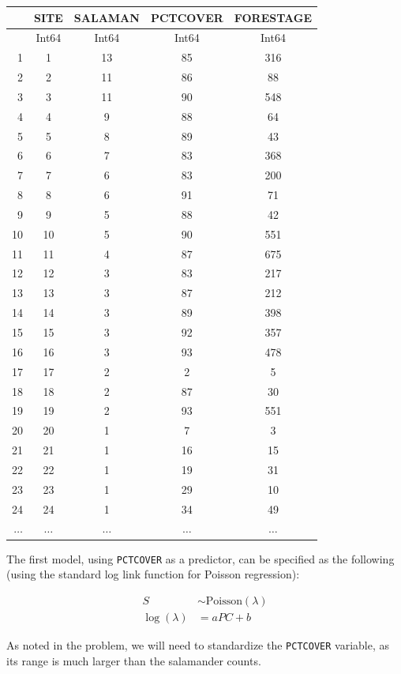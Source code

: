 \documentclass[
  letterpaper,
  DIV=11,
  numbers=noendperiod]{scrartcl}
\begin{document}
\begin{tabular}{r|cccc}
    & SITE & SALAMAN & PCTCOVER & FORESTAGE\\
    \hline
    & Int64 & Int64 & Int64 & Int64\\
    \hline
    1 & 1 & 13 & 85 & 316 \\
    2 & 2 & 11 & 86 & 88 \\
    3 & 3 & 11 & 90 & 548 \\
    4 & 4 & 9 & 88 & 64 \\
    5 & 5 & 8 & 89 & 43 \\
    6 & 6 & 7 & 83 & 368 \\
    7 & 7 & 6 & 83 & 200 \\
    8 & 8 & 6 & 91 & 71 \\
    9 & 9 & 5 & 88 & 42 \\
    10 & 10 & 5 & 90 & 551 \\
    11 & 11 & 4 & 87 & 675 \\
    12 & 12 & 3 & 83 & 217 \\
    13 & 13 & 3 & 87 & 212 \\
    14 & 14 & 3 & 89 & 398 \\
    15 & 15 & 3 & 92 & 357 \\
    16 & 16 & 3 & 93 & 478 \\
    17 & 17 & 2 & 2 & 5 \\
    18 & 18 & 2 & 87 & 30 \\
    19 & 19 & 2 & 93 & 551 \\
    20 & 20 & 1 & 7 & 3 \\
    21 & 21 & 1 & 16 & 15 \\
    22 & 22 & 1 & 19 & 31 \\
    23 & 23 & 1 & 29 & 10 \\
    24 & 24 & 1 & 34 & 49 \\
    $\dots$ & $\dots$ & $\dots$ & $\dots$ & $\dots$ \\
\end{tabular}

The first model, using \texttt{PCTCOVER} as a predictor, can be
specified as the following (using the standard log link function for
Poisson regression):

\[
\begin{aligned}
S &\sim \text{Poisson}(\lambda) \\
\log(\lambda) &= a PC + b
\end{aligned}
\]

As noted in the problem, we will need to standardize the
\texttt{PCTCOVER} variable, as its range is much larger than the
salamander counts.
\end{document}
